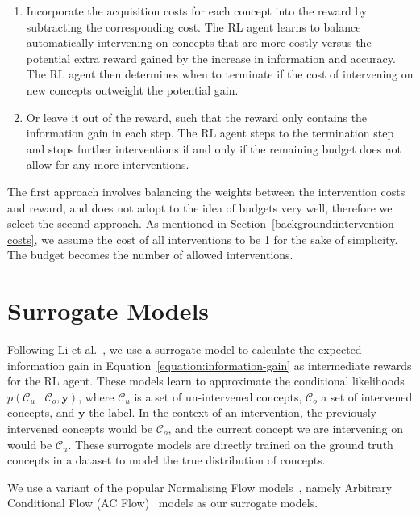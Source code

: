 \begin{enumerate}
    \item Incorporate the acquisition costs for each concept into the reward by subtracting
    the corresponding cost. The RL agent
    learns to balance automatically intervening on concepts that are more costly versus the
    potential extra reward gained by the increase in information and accuracy. The RL agent then determines when to terminate
    if the cost of intervening on new concepts outweight the potential gain.
    \item Or leave it out of the reward, such that
    the reward only contains the information gain in each step. 
    The RL agent steps to the termination
    step and stops further interventions if and only if the remaining budget does not allow for any more interventions.
\end{enumerate}

The first approach
involves balancing the weights between the intervention costs and reward, and does not 
adopt to the idea of budgets very well, therefore we select the second approach.
As mentioned in Section~\ref{background:intervention-costs}, we assume the cost of all interventions to be 1 for the sake of simplicity.
The budget 
becomes the number of allowed interventions.

\section{Surrogate Models}\label{method:surrogate}

Following Li et al.~\cite{gsmrl},
we use a surrogate model to calculate the expected information gain in Equation~\ref{equation:information-gain} as intermediate rewards for the RL agent.
These models learn
to approximate
the conditional likelihoods $p(\mathcal{C}_u \mid \mathcal{C}_o, \mathbf{y})$, 
where $\mathcal{C}_u$ is a set of un-intervened
concepts, $\mathcal{C}_o$ a set of intervened concepts,
and $\mathbf{y}$ the label.
In the context of an intervention, the previously intervened concepts would be $\mathcal{C}_o$,
and the current concept we are intervening on would be
$\mathcal{C}_u$. These surrogate models are directly trained on the ground truth concepts 
in a dataset to model the true distribution of concepts.

We use a variant of the popular Normalising Flow models~\cite{Normalising-flows},
namely Arbitrary Conditional Flow (AC Flow)~\cite{acflow}
models as our surrogate models.

